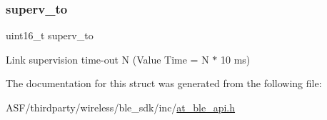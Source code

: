 \mbox{\label{structat__ble__connection__params__t_a2bfc39c9b1e75f97c055d5978387570d}} 
\subsubsection{\texorpdfstring{superv\_to}{superv\_to}}
{\footnotesize\ttfamily uint16\+\_\+t superv\+\_\+to}



Link supervision time-\/out N (Value Time = N $\ast$ 10 ms) 



The documentation for this struct was generated from the following file\+:\begin{DoxyCompactItemize}
\item 
A\+S\+F/thirdparty/wireless/ble\+\_\+sdk/inc/\mbox{\hyperlink{at__ble__api_8h}{at\+\_\+ble\+\_\+api.\+h}}\end{DoxyCompactItemize}
